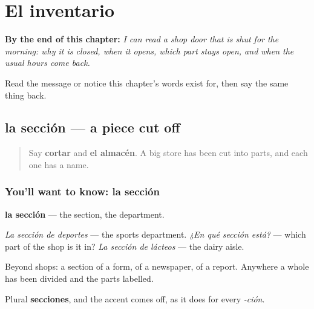
\chapter{El inventario}
\label{ch:es-stock}

\begin{chapteropening}
\textbf{By the end of this chapter:} \emph{I can read a shop door that is shut for the morning: why it is closed, when it opens, which part stays open, and when the usual hours come back.}

Read the message or notice this chapter's words exist for, then say the same thing back.
\end{chapteropening}

\section[la sección]{la sección — a piece cut off}

\label{lesson:ES-C459-seccion}



\begin{quote}
Say \textbf{cortar} and \textbf{el almacén}. A big store has been cut into parts, and each one has a name.
\end{quote}

\subsection*{You'll want to know: la sección}
\textbf{la sección} — the section, the department.

\emph{La sección de deportes} — the sports department. \emph{¿En qué sección está?} — which part of the shop is it in? \emph{La sección de lácteos} — the dairy aisle.

Beyond shops: a section of a form, of a newspaper, of a report. Anywhere a whole has been divided and the parts labelled.

Plural \textbf{secciones}, and the accent comes off, as it does for every \emph{-ción}.

